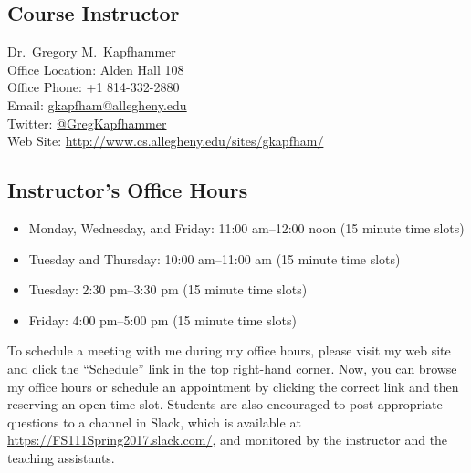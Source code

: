 

\usepackage[compact]{titlesec}



\subsection*{Course Instructor}
Dr.\ Gregory M.\ Kapfhammer\\
\noindent Office Location: Alden Hall 108 \\
\noindent Office Phone: +1 814-332-2880 \\
\noindent Email: \url{gkapfham@allegheny.edu} \\
\noindent Twitter: \url{@GregKapfhammer} \\
\noindent Web Site: \url{http://www.cs.allegheny.edu/sites/gkapfham/}

\subsection*{Instructor's Office Hours}

\begin{itemize}
  \itemsep0em

  \item Monday, Wednesday, and Friday: 11:00 am--12:00 noon (15 minute time slots)

  \item Tuesday and Thursday: 10:00 am--11:00 am (15 minute time slots)

  \item Tuesday: 2:30 pm--3:30 pm (15 minute time slots)

  \item Friday: 4:00 pm--5:00 pm (15 minute time slots)

\end{itemize}

\vspace*{-.1in}

\noindent To schedule a meeting with me during my office hours, please visit my web site and click the ``Schedule'' link
in the top right-hand corner. Now, you can browse my office hours or schedule an appointment by clicking the correct
link and then reserving an open time slot. Students are also encouraged to post appropriate questions to a channel in
Slack, which is available at \url{https://FS111Spring2017.slack.com/}, and monitored by the instructor and the
teaching assistants.

